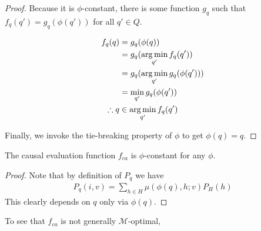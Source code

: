 \begin{proof}
Because it is $\phi$-constant, there is some function $g_q$ such that $f_q(q')=g_q(\phi(q'))$ for all $q'\in Q$.

\begin{align}
    f_q(q)       &= g_q(\phi(q))\\
                 &= g_q(\operatorname*{arg\,min}_{q'} f_q(q'))\\
                 &= g_q(\operatorname*{arg\,min}_{q'} g_q(\phi(q')))\\
                 &= \min_{q'} g_q(\phi(q'))\\
    \therefore  q&\in \operatorname*{arg\,min}_{q'} f_q(q') 
\end{align}

Finally, we invoke the tie-breaking property of $\phi$ to get $\phi(q)=q$.
\end{proof}

\begin{lemma}
The causal evaluation function $f_{ca}$ is $\phi$-constant for any $\phi$.
\end{lemma}

\begin{proof}
Note that by definition of $P_q$ we have
\begin{align}
    P_q(i,v) = \sum_{h\in H}\mu(\phi(q),h;v)P_H(h)
\end{align}
This clearly depends on $q$ only via $\phi(q)$.
\end{proof}


To see that $f_{ca}$ is not generally $\mathscr{M}$-optimal, 
